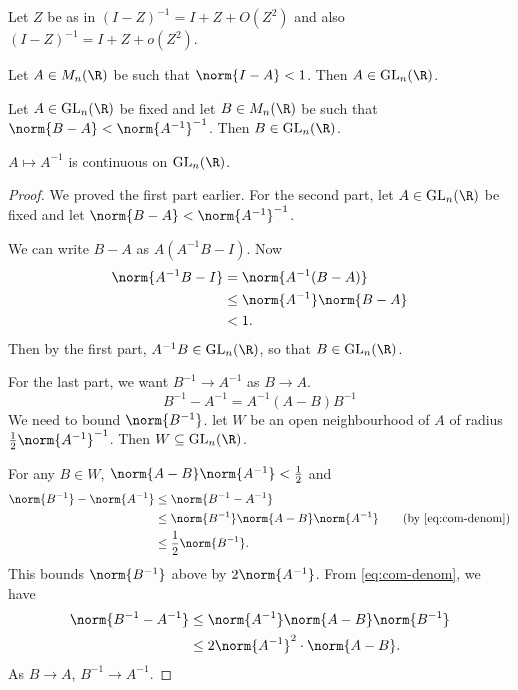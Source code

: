 
\begin{exercise}
    Let $Z$ be as in 
    $(I - Z)^{-1} = I + Z + O(Z^2)$ and also
    $(I - Z)^{-1} = I + Z + o(Z^2)$.
\end{exercise}

\begin{proposition} \label{thm:inv-cont}
    Let $A \in M_n(\R)$ be such that $\norm{I - A} < 1$.
    Then $A \in \GL_n(\R)$.

    Let $A \in \GL_n(\R)$ be fixed and let $B \in M_n(\R)$ be such that
    $\norm{B - A} < \norm{A^{-1}}^{-1}$.
    Then $B \in \GL_n(\R)$.

    $A \mapsto A^{-1}$ is continuous on $\GL_n(\R)$.
\end{proposition}
\begin{proof}
    We proved the first part earlier.
    For the second part, let $A \in \GL_n(\R)$ be fixed and
    let $\norm{B - A} < {\norm{A^{-1}}}^{-1}$.

    We can write $B - A$ as $A(A^{-1}B - I)$.
    Now \begin{align*}
        \norm{A^{-1}B - I} &= \norm{A^{-1} (B - A)} \\
        &\leq \norm{A^{-1}} \norm{B - A} \\
        &< 1.
    \end{align*}
    Then by the first part, $A^{-1}B \in \GL_n(\R)$, so that
    $B \in \GL_n(\R)$.

    For the last part, we want $B^{-1} \to A^{-1}$ as $B \to A$.
    \begin{equation}
        B^{-1} - A^{-1} = A^{-1}(A - B)B^{-1} \label{eq:com-denom}
    \end{equation}
    We need to bound $\norm{B^{-1}}$.
    let $W$ be an open neighbourhood of $A$ of radius
    $\frac12 \norm{A^{-1}}^{-1}$.
    Then $W \subseteq \GL_n(\R)$.

    For any $B \in W$, $\norm{A - B} \norm{A^{-1}} < \frac12$
    and \begin{align*}
        \norm{B^{-1}} - \norm{A^{-1}}
            &\le \norm{B^{-1} - A^{-1}} \\
            &\le \norm{B^{-1}} \norm{A - B} \norm{A^{-1}}
                \tag{by \cref{eq:com-denom}} \\
            &\le \frac12 \norm{B^{-1}}.
    \end{align*}
    This bounds $\norm{B^{-1}}$ above by $2\norm{A^{-1}}$.
    From \cref{eq:com-denom}, we have \begin{align*}
        \norm{B^{-1} - A^{-1}}
            &\le \norm{A^{-1}} \norm{A - B} \norm{B^{-1}} \\
            &\le 2 {\norm{A^{-1}}}^2 \cdot \norm{A - B}.
    \end{align*}
    As $B \to A$, $B^{-1} \to A^{-1}$.
\end{proof}
